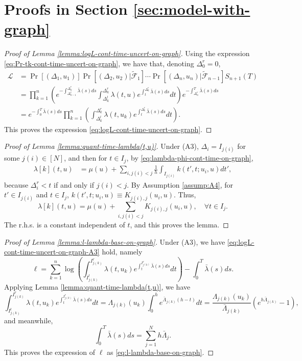 \documentclass[11pt]{article}
\theoremstyle{remark}
\theoremstyle{plain}
\newcommand{\calL}{\mathcal{L}}
\newcommand{\calF}{\mathcal{F}}
\begin{document}
\section{Proofs in Section \ref{sec:model-with-graph}}\label{app:proofs-sec:5}
%
\begin{proof}[Proof of Lemma \ref{lemma:logL-cont-time-uncert-on-graph}]
Using the expression \eqref{eq:Pr-tk-cont-time-uncert-on-graph}, we have that, denoting $\Delta_{0}^r = 0$,
\begin{align*}
\calL 
& = \Pr[ ( \Delta_1, u_1)  ]   
    \Pr[ ( \Delta_2, u_2) | \tilde{\calF}_{1}  ]
    \cdots 
    \Pr[ (\Delta_n, u_n) | \tilde{\calF}_{n-1}  ]
    S_{n+1}(T) \nonumber  \\
&=    \prod_{k=1}^n \left(  e^{ - \int_{\Delta_{k-1}^r}^{\Delta_{k}^r}  \bar{\lambda} (s) ds}  
	\int_{\Delta_k^l}^{\Delta_k^r} \lambda( t, u) e^{ \int_t^{\Delta_{k}^r}  \bar{\lambda} (s) ds} dt \right)
	e^{ - \int_{\Delta_{n}^r}^{T}  \bar{\lambda} (s) ds} \nonumber \\
& = 	e^{ - \int_{0}^{T}  \bar{\lambda} (s) ds}  
	\prod_{k=1}^n \left( \int_{\Delta_k^l}^{\Delta_k^r} \lambda( t, u_k) e^{ \int_t^{\Delta_{k}^r}  \bar{\lambda} (s) ds} dt
		\right).
\end{align*}
This proves the expression \eqref{eq:logL-cont-time-uncert-on-graph}.
\end{proof}

%
\begin{proof}[Proof of Lemma \ref{lemma:quant-time-lambda(t,u)}]
Under (A3), $\Delta_i = I_{j(i)}$ for some $j(i) \in [N]$, and then  for $t \in I_j $, 
by \eqref{eq:lambda-phi-cont-time-on-graph},
\begin{align*}
   \lambda[k](t, u) 
 & = \mu(u) + \sum_{i, j(i) < j } \frac{1}{ h  }  \int_{I_{j(i)}}  k( t', t; u_i, u) dt',
\end{align*}
because $\Delta_i^r < t$ if and only if $j(i) < j$.
By Assumption \ref{assump:A4},  for $t' \in I_{j(i)}$ and $t \in I_j$,  $k(t', t; u_i, u) \equiv K_{ j(i), j} (u_i, u)$.
Thus,
\[
   \lambda[k](t, u)  =  \mu(u) + \sum_{i, j(i) < j }  K_{ j(i), j} (u_i, u), \quad \forall t \in I_j.
\]
The r.h.s. is a constant independent of $t$, and this proves the lemma. 
\end{proof}
%
\begin{proof}[Proof of Lemma \ref{lemma:l-lambda-base-on-graph}]
Under (A3), we have \eqref{eq:logL-cont-time-uncert-on-graph-A3} hold, namely
\[
\ell = \sum_{k=1}^n \log \left( 
\int_{I_{j(k)}^l}^{I_{j(k)}^r} \lambda( t, u_k) e^{ \int_t^{I_{j(k)}^r}  \bar{\lambda} (s) ds} dt
		\right) - \int_0^T \bar{\lambda}(s) ds.
\]		
 Applying Lemma \ref{lemma:quant-time-lambda(t,u)}, 
we have 
\[
\int_{I_{j(k)}^l}^{I_{j(k)}^r} \lambda( t, u_k) e^{ \int_t^{I_{j(k)}^r}  \bar{\lambda} (s) ds} dt
= \Lambda_{j(k)} (u_k)  \int_{0}^{ h}  e^{  \bar{\Lambda}_{j(k)}  (h- t)} dt
=  \frac{ \Lambda_{j(k)} (u_k) }{ \bar{\Lambda}_{j(k)} }  (   e^{ h  \bar{ \Lambda}_{j(k)}  } - 1), 
\]
and meanwhile,
\[
\int_0^T \bar{\lambda}(s) ds   = \sum_{j=1}^N h \bar{\Lambda}_j. 
\]
This proves the expression of $\ell$ as \eqref{eq:l-lambda-base-on-graph}.
\end{proof}
\end{document}
